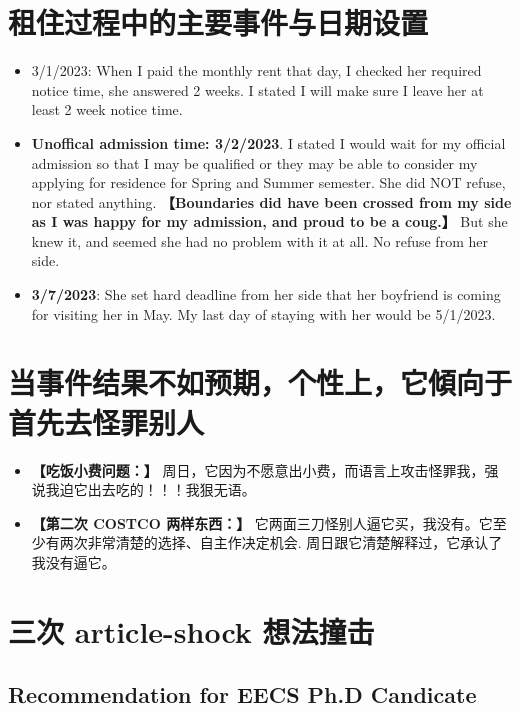 \documentclass[9pt, b5paper]{article}
\begin{document}
\section{租住过程中的主要事件与日期设置}
\label{sec-3}
\begin{itemize}
\item 3/1/2023: When I paid the monthly rent that day, I checked her required notice time, she answered 2 weeks. I stated I will make sure I leave her at least 2 week notice time.
\item \textbf{Unoffical admission time: 3/2/2023}. I stated I would wait for my official admission so that I may be qualified or they may be able to consider my applying for residence for Spring and Summer semester. She did NOT refuse, nor stated anything. \textbf{【Boundaries did have been crossed from my side as I was happy for my admission, and proud to be a coug.】} But she knew it, and seemed she had no problem with it at all. No refuse from her side.
\item \textbf{3/7/2023}: She set hard deadline from her side that her boyfriend is coming for visiting her in May. My last day of staying with her would be 5/1/2023.
\end{itemize}

\section{当事件结果不如预期，个性上，它傾向于首先去怪罪别人}
\label{sec-4}
\begin{itemize}
\item \textbf{【吃饭小费问题：】} 周日，它因为不愿意出小费，而语言上攻击怪罪我，强说我迫它出去吃的！！！我狠无语。
\item \textbf{【第二次 COSTCO 两样东西：】} 它两面三刀怪别人逼它买，我没有。它至少有两次非常清楚的选择、自主作决定机会. 周日跟它清楚解释过，它承认了我没有逼它。
\end{itemize}

\section{三次 article-shock 想法撞击}
\label{sec-5}
\subsection{Recommendation for EECS Ph.D Candicate}
\label{sec-5-1}
\end{document}

